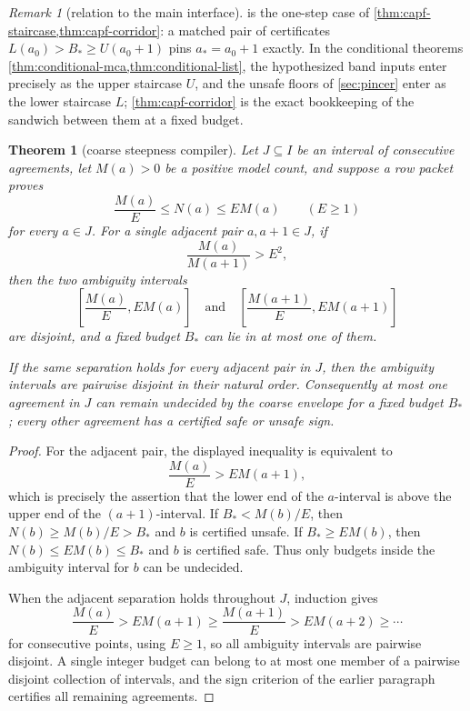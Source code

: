 \documentclass[11pt]{article}
\newtheorem{theorem}{Theorem}[section]
\theoremstyle{definition}
\theoremstyle{remark}
\newtheorem{remark}[remark]{Remark}
\begin{document}
\begin{remark}[relation to the main interface]\label{rem:capf-staircase-main}
 is the one-step case of \cref{thm:capf-staircase,thm:capf-corridor}: a matched pair of certificates $L(a_0)>B_*\ge U(a_0+1)$ pins $a_*=a_0+1$ exactly.  In the conditional theorems \cref{thm:conditional-mca,thm:conditional-list}, the hypothesized band inputs enter precisely as the upper staircase $U$, and the unsafe floors of \cref{sec:pincer} enter as the lower staircase $L$; \cref{thm:capf-corridor} is the exact bookkeeping of the sandwich between them at a fixed budget.
\end{remark}

\begin{theorem}[coarse steepness compiler]\label{thm:capf-steepness}
Let $J\subseteq I$ be an interval of consecutive agreements, let $M(a)>0$ be a positive model count, and suppose a row packet proves
\[
        \frac{M(a)}{E}\le N(a)\le E M(a)\qquad(E\ge1)
\]
for every $a\in J$.  For a single adjacent pair $a,a+1\in J$, if
\[
        \frac{M(a)}{M(a+1)}>E^2,
\]
then the two ambiguity intervals
\[
        \left[\frac{M(a)}E,EM(a)\right]
        \quad\text{and}\quad
        \left[\frac{M(a+1)}E,EM(a+1)\right]
\]
are disjoint, and a fixed budget $B_*$ can lie in at most one of them.

If the same separation holds for every adjacent pair in $J$, then the ambiguity intervals are pairwise disjoint in their natural order.  Consequently at most one agreement in $J$ can remain undecided by the coarse envelope for a fixed budget $B_*$; every other agreement has a certified safe or unsafe sign.
\end{theorem}

\begin{proof}
For the adjacent pair, the displayed inequality is equivalent to
\[
        \frac{M(a)}E>EM(a+1),
\]
which is precisely the assertion that the lower end of the $a$-interval is above the upper end of the $(a+1)$-interval.  If $B_*<M(b)/E$, then $N(b)\ge M(b)/E>B_*$ and $b$ is certified unsafe.  If $B_*\ge EM(b)$, then $N(b)\le EM(b)\le B_*$ and $b$ is certified safe.  Thus only budgets inside the ambiguity interval for $b$ can be undecided.

When the adjacent separation holds throughout $J$, induction gives
\[
        \frac{M(a)}E>EM(a+1)\ge \frac{M(a+1)}E>EM(a+2)\ge\cdots
\]
for consecutive points, using $E\ge1$, so all ambiguity intervals are pairwise disjoint.  A single integer budget can belong to at most one member of a pairwise disjoint collection of intervals, and the sign criterion of the earlier paragraph certifies all remaining agreements.
\end{proof}
\end{document}
